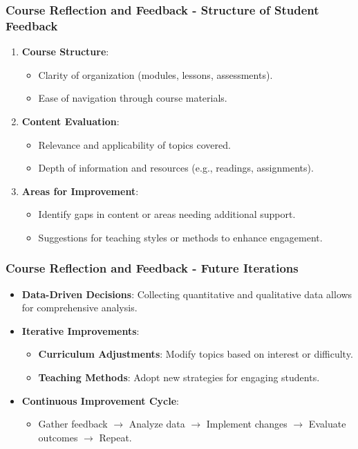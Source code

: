 \documentclass[aspectratio=169]{beamer}
\begin{document}
\begin{frame}[fragile]
  \frametitle{Course Reflection and Feedback - Structure of Student Feedback}
  \begin{enumerate}
    \item \textbf{Course Structure}:
      \begin{itemize}
        \item Clarity of organization (modules, lessons, assessments).
        \item Ease of navigation through course materials.
      \end{itemize}
      
    \item \textbf{Content Evaluation}:
      \begin{itemize}
        \item Relevance and applicability of topics covered.
        \item Depth of information and resources (e.g., readings, assignments).
      \end{itemize}
      
    \item \textbf{Areas for Improvement}:
      \begin{itemize}
        \item Identify gaps in content or areas needing additional support.
        \item Suggestions for teaching styles or methods to enhance engagement.
      \end{itemize}
  \end{enumerate}
\end{frame}

\begin{frame}[fragile]
  \frametitle{Course Reflection and Feedback - Future Iterations}
  \begin{itemize}
    \item \textbf{Data-Driven Decisions}: Collecting quantitative and qualitative data allows for comprehensive analysis.
    \item \textbf{Iterative Improvements}:
      \begin{itemize}
        \item \textbf{Curriculum Adjustments}: Modify topics based on interest or difficulty.
        \item \textbf{Teaching Methods}: Adopt new strategies for engaging students.
      \end{itemize}
    \item \textbf{Continuous Improvement Cycle}:
      \begin{itemize}
        \item Gather feedback $\rightarrow$ Analyze data $\rightarrow$ Implement changes $\rightarrow$ Evaluate outcomes $\rightarrow$ Repeat.
      \end{itemize}
  \end{itemize}
\end{frame}
\end{document}
